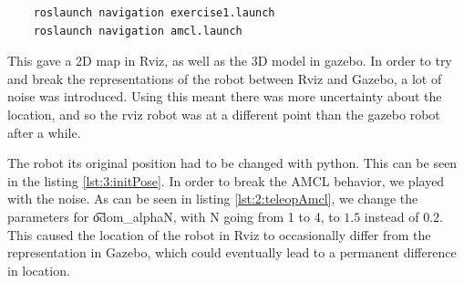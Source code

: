 \begin{lstlisting}
	roslaunch navigation exercise1.launch
	roslaunch navigation amcl.launch
\end{lstlisting}

This gave a 2D map in Rviz, as well as the 3D model in gazebo. In order to try and break the representations of the robot between Rviz and Gazebo, a lot of noise was introduced. Using this meant there was more uncertainty about the location, and so the rviz robot was at a different point than the gazebo robot after a while.





The robot its original position had to be changed with python. This can be seen in the listing \ref{lst:3:initPose}. In order to break the AMCL behavior, we played with the noise. As can be seen in listing \ref{lst:2:teleopAmcl}, we change the parameters for \t{odom_alphaN}, with N going from 1 to 4, to $1.5$ instead of $0.2$. This caused the location of the robot in Rviz to occasionally differ from the representation in Gazebo, which could eventually lead to a permanent difference in location.